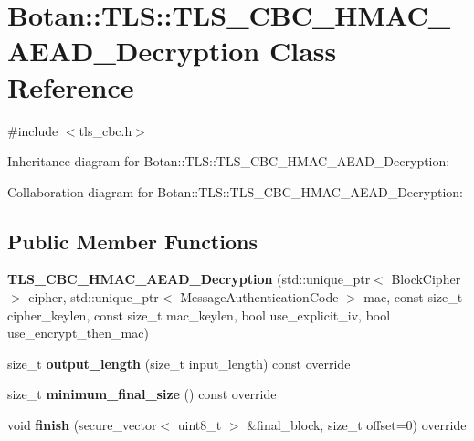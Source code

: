 \hypertarget{class_botan_1_1_t_l_s_1_1_t_l_s___c_b_c___h_m_a_c___a_e_a_d___decryption}{}\section{Botan\+:\+:T\+LS\+:\+:T\+L\+S\+\_\+\+C\+B\+C\+\_\+\+H\+M\+A\+C\+\_\+\+A\+E\+A\+D\+\_\+\+Decryption Class Reference}
\label{class_botan_1_1_t_l_s_1_1_t_l_s___c_b_c___h_m_a_c___a_e_a_d___decryption}


{\ttfamily \#include $<$tls\+\_\+cbc.\+h$>$}



Inheritance diagram for Botan\+:\+:T\+LS\+:\+:T\+L\+S\+\_\+\+C\+B\+C\+\_\+\+H\+M\+A\+C\+\_\+\+A\+E\+A\+D\+\_\+\+Decryption\+:


Collaboration diagram for Botan\+:\+:T\+LS\+:\+:T\+L\+S\+\_\+\+C\+B\+C\+\_\+\+H\+M\+A\+C\+\_\+\+A\+E\+A\+D\+\_\+\+Decryption\+:
\subsection*{Public Member Functions}
\begin{DoxyCompactItemize}
\item 
\mbox{\label{class_botan_1_1_t_l_s_1_1_t_l_s___c_b_c___h_m_a_c___a_e_a_d___decryption_a2cd056c52b8f31af5d4a5e6cd8c484b3}} 
{\bfseries T\+L\+S\+\_\+\+C\+B\+C\+\_\+\+H\+M\+A\+C\+\_\+\+A\+E\+A\+D\+\_\+\+Decryption} (std\+::unique\+\_\+ptr$<$ Block\+Cipher $>$ cipher, std\+::unique\+\_\+ptr$<$ Message\+Authentication\+Code $>$ mac, const size\+\_\+t cipher\+\_\+keylen, const size\+\_\+t mac\+\_\+keylen, bool use\+\_\+explicit\+\_\+iv, bool use\+\_\+encrypt\+\_\+then\+\_\+mac)
\item 
\mbox{\label{class_botan_1_1_t_l_s_1_1_t_l_s___c_b_c___h_m_a_c___a_e_a_d___decryption_aed2f17fa0b47e7f49b65e917e64a9afd}} 
size\+\_\+t {\bfseries output\+\_\+length} (size\+\_\+t input\+\_\+length) const override
\item 
\mbox{\label{class_botan_1_1_t_l_s_1_1_t_l_s___c_b_c___h_m_a_c___a_e_a_d___decryption_ad15d03452613b9c74b8f027aafd6e2f4}} 
size\+\_\+t {\bfseries minimum\+\_\+final\+\_\+size} () const override
\item 
\mbox{\label{class_botan_1_1_t_l_s_1_1_t_l_s___c_b_c___h_m_a_c___a_e_a_d___decryption_a87a1409ec8186762bd04ece68e8850c5}} 
void {\bfseries finish} (secure\+\_\+vector$<$ uint8\+\_\+t $>$ \&final\+\_\+block, size\+\_\+t offset=0) override
\end{DoxyCompactItemize}
